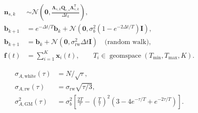 \documentclass[11pt,oneside,headings=big]{scrreprt}
\newcommand{\Normal}{\mathcal{N}}
\newcommand{\transpose}{\mathsf{T}}
\newcommand{\vect}[1]{\bm{#1}}
\newcommand{\mat}[1]{\bm{#1}}
\begin{document}
    \begin{tcolorbox}[
        enhanced,breakable,colback=ImuPaleGold,colframe=ImuGold,
        title={Stochastic updates},fonttitle=\bfseries]
        \begin{align*}
            \vect n_{s,k}&\sim\Normal\!\left(
                                           \vect0,\frac{\mat\Lambda_{s,k}\mat Q_{c,s}
                    \mat\Lambda_{s,k}^\transpose}{\Delta t_k}\right),\\
            \vect b_{k+1}&=e^{-\Delta t/T}\vect b_k
            +\Normal\!\left(\vect0,
                          \sigma_b^2(1-e^{-2\Delta t/T})\mat I\right),\\
            \vect b_{k+1}&=\vect b_k
            +\Normal\!\left(\vect0,
                          \sigma_{\mathrm{rw}}^2\Delta t\mat I\right)
            \quad\text{(random walk)},\\
            \vect f(t)&=\sum_{i=1}^{K}\vect x_i(t),
            \qquad T_i\in\operatorname{geomspace}(T_{\min},T_{\max},K).
        \end{align*}
    \end{tcolorbox}

    \begin{tcolorbox}[
        enhanced,breakable,colback=white,colframe=ImuOrange,
        title={Allan references},fonttitle=\bfseries]
        \begin{align*}
            \sigma_{A,\mathrm{white}}(\tau)&=N/\sqrt\tau,\\
            \sigma_{A,\mathrm{rw}}(\tau)&=\sigma_{\mathrm{rw}}\sqrt{\tau/3},\\
            \sigma_{A,\mathrm{GM}}^2(\tau)
            &=\sigma_b^2\left[
                            \frac{2T}{\tau}-\left(\frac{T}{\tau}\right)^2
                (3-4e^{-\tau/T}+e^{-2\tau/T})
            \right].
        \end{align*}
    \end{tcolorbox}

    \printbibliography[heading=bibintoc,title={References}]
\end{document}
